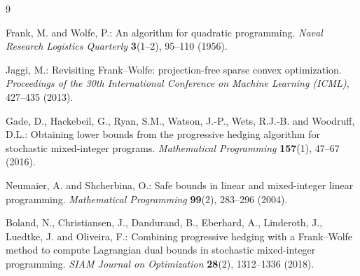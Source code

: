 \documentclass[11pt]{article}
\theoremstyle{plain}
\theoremstyle{remark}
\begin{document}
\begin{thebibliography}{9}

Frank, M. and Wolfe, P.:
\newblock An algorithm for quadratic programming.
\newblock \emph{Naval Research Logistics Quarterly} \textbf{3}(1--2), 95--110 (1956).

Jaggi, M.:
\newblock Revisiting Frank--Wolfe: projection-free sparse convex optimization.
\newblock \emph{Proceedings of the 30th International Conference on Machine
Learning (ICML)}, 427--435 (2013).

Gade, D., Hackebeil, G., Ryan, S.M., Watson, J.-P., Wets, R.J.-B. and
Woodruff, D.L.:
\newblock Obtaining lower bounds from the progressive hedging algorithm for
stochastic mixed-integer programs.
\newblock \emph{Mathematical Programming} \textbf{157}(1), 47--67 (2016).

Neumaier, A. and Shcherbina, O.:
\newblock Safe bounds in linear and mixed-integer linear programming.
\newblock \emph{Mathematical Programming} \textbf{99}(2), 283--296 (2004).

Boland, N., Christiansen, J., Dandurand, B., Eberhard, A., Linderoth, J.,
Luedtke, J. and Oliveira, F.:
\newblock Combining progressive hedging with a Frank--Wolfe method to compute
Lagrangian dual bounds in stochastic mixed-integer programming.
\newblock \emph{SIAM Journal on Optimization} \textbf{28}(2), 1312--1336 (2018).

\end{thebibliography}
\end{document}
